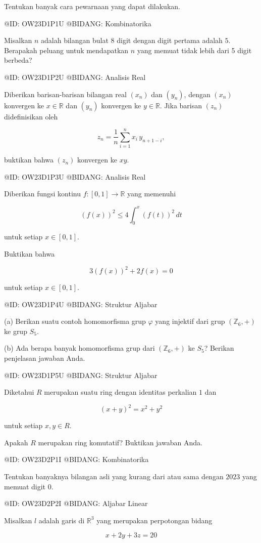Tentukan banyak cara pewarnaan yang dapat dilakukan.

@ID: OW23D1P1U
@BIDANG: Kombinatorika

Misalkan $n$ adalah bilangan bulat 8 digit dengan digit pertama adalah $5$. Berapakah peluang untuk mendapatkan $n$ yang memuat tidak lebih dari 5 digit berbeda?

@ID: OW23D1P2U
@BIDANG: Analisis Real

Diberikan barisan-barisan bilangan real $(x_n)$ dan $(y_n)$, dengan $(x_n)$ konvergen ke $x\in\mathbb R$ dan $(y_n)$ konvergen ke $y\in\mathbb R$. Jika barisan $(z_n)$ didefinisikan oleh

$$
z_n=\frac1n\sum_{i=1}^{n}x_i\,y_{n+1-i},
$$

buktikan bahwa $(z_n)$ konvergen ke $xy$.

@ID: OW23D1P3U
@BIDANG: Analisis Real

Diberikan fungsi kontinu $f:[0,1]\to\mathbb R$ yang memenuhi

$$
(f(x))^2
\le
4\int_0^x(f(t))^2\,dt
$$

untuk setiap $x\in[0,1]$.

Buktikan bahwa

$$
3(f(x))^2+2f(x)=0
$$

untuk setiap $x\in[0,1]$.

@ID: OW23D1P4U
@BIDANG: Struktur Aljabar

(a) Berikan suatu contoh homomorfisma grup $\varphi$ yang injektif dari grup $(\mathbb Z_6,+)$ ke grup $S_5$.

(b) Ada berapa banyak homomorfisma grup dari $(\mathbb Z_6,+)$ ke $S_5$? Berikan penjelasan jawaban Anda.

@ID: OW23D1P5U
@BIDANG: Struktur Aljabar

Diketahui $R$ merupakan suatu ring dengan identitas perkalian $1$ dan

$$
(x+y)^2=x^2+y^2
$$

untuk setiap $x,y\in R$.

Apakah $R$ merupakan ring komutatif? Buktikan jawaban Anda.

@ID: OW23D2P1I
@BIDANG: Kombinatorika

Tentukan banyaknya bilangan asli yang kurang dari atau sama dengan $2023$ yang memuat digit $0$.

@ID: OW23D2P2I
@BIDANG: Aljabar Linear

Misalkan $l$ adalah garis di $\mathbb R^3$ yang merupakan perpotongan bidang

$$
x+2y+3z=20
$$

